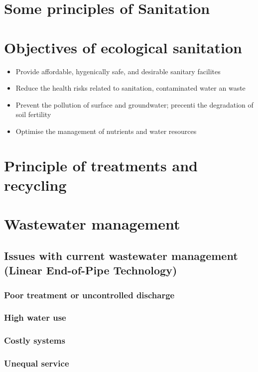 \documentclass{article}
\begin{document}
\section{Some principles of Sanitation}

\section{Objectives of ecological sanitation}
\begin{itemize}
    \item Provide affordable, hygenically safe, and desirable sanitary facilites
    \item Reduce the health risks related to sanitation, contaminated water an waste
    \item Prevent the pollution of surface and groundwater; precenti the degradation of soil fertility
    \item Optimise the management of nutrients and water resources
\end{itemize}

\section{Principle of treatments and recycling}

\section{Wastewater management}
\subsection{Issues with current wastewater management (Linear End-of-Pipe Technology)}
\subsubsection{Poor treatment or uncontrolled discharge}

\subsubsection{High water use}

\subsubsection{Costly systems}

\subsubsection{Unequal service}
\end{document}
